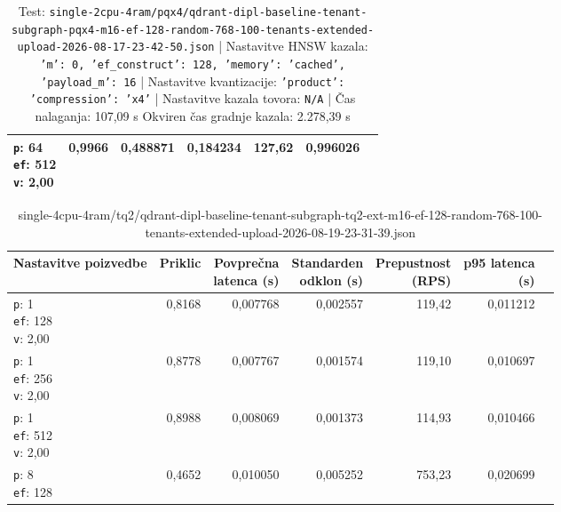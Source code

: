 \begin{table}[htbp]
\begin{tabularx}{\textwidth}{Xrrrrrr}
    \makecell{\texttt{p}: 64\\\texttt{ef}: 512\\\texttt{v}: 2,00} & 0,9966 & 0,488871 & 0,184234 & 127,62 & 0,996026 \\
    \bottomrule
  \end{tabularx}
\caption* {Test: \texttt{single-2cpu-4ram/pqx4/qdrant-dipl-baseline-tenant-subgraph-pqx4-m16-ef-128-random-768-100-tenants-extended-upload-2026-08-17-23-42-50.json} | Nastavitve HNSW kazala: \texttt{{'m': 0, 'ef\_construct': 128, 'memory': 'cached', 'payload\_m': 16}} | Nastavitve kvantizacije: \texttt{{'product': {'compression': 'x4'}}} | Nastavitve kazala tovora: \texttt{N/A} | Čas nalaganja: 107,09 s Okviren čas gradnje kazala: 2.278,39 s}\end{table}


\begin{table}[htbp]
  \centering
\small
  \caption{single-4cpu-4ram/tq2/qdrant-dipl-baseline-tenant-subgraph-tq2-ext-m16-ef-128-random-768-100-tenants-extended-upload-2026-08-19-23-31-39.json}
  \label{tab:single-4cpu-4ram:tq2:qdrant-dipl-baseline-tenant-subgraph-tq2-ext-m16-ef-128-random-768-100-tenants-extended-upload-2026-08-19-23-31-39.json}
  \begin{tabularx}{\textwidth}{Xrrrrrr}
    \toprule
    Nastavitve poizvedbe & Priklic & \makecell{Povprečna\\latenca (s)} & \makecell{Standarden\\odklon (s)} & \makecell{Prepustnost\\(RPS)} & \makecell{p95 latenca\\(s)}  \\
    \midrule
    \makecell{\texttt{p}: 1\\\texttt{ef}: 128\\\texttt{v}: 2,00} & 0,8168 & 0,007768 & 0,002557 & 119,42 & 0,011212 \\
    \makecell{\texttt{p}: 1\\\texttt{ef}: 256\\\texttt{v}: 2,00} & 0,8778 & 0,007767 & 0,001574 & 119,10 & 0,010697 \\
    \makecell{\texttt{p}: 1\\\texttt{ef}: 512\\\texttt{v}: 2,00} & 0,8988 & 0,008069 & 0,001373 & 114,93 & 0,010466 \\
    \makecell{\texttt{p}: 8\\\texttt{ef}: 128} & 0,4652 & 0,010050 & 0,005252 & 753,23 & 0,020699 \\

\end{tabularx}
\end{table}
